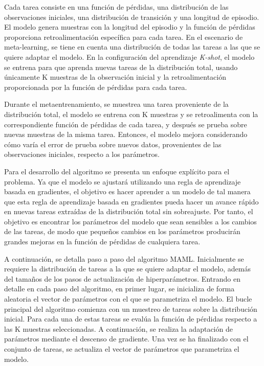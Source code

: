 Cada tarea consiste en una función de pérdidas, una distribución de las observaciones iniciales, una distribución de transición y una longitud de episodio. El modelo genera muestras con la longitud del episodio y la función de pérdidas proporciona retroalimentación específica para cada tarea.
En el escenario de meta-learning, se tiene en cuenta una distribución de todas las tareas a las que se quiere adaptar el modelo. En la configuración del aprendizaje \emph{K-shot}, el modelo se entrena para que aprenda nuevas tareas de la distribución total, usando únicamente K muestras de la observación inicial y la retroalimentación proporcionada por la función de pérdidas para cada tarea. 

Durante el metaentrenamiento, se muestrea una tarea proveniente de la distribución total, el modelo se entrena con K muestras y se retroalimenta con la correspondiente función de pérdidas de cada tarea, y después se prueba sobre nuevas muestras de la misma tarea. Entonces, el modelo mejora considerando cómo varía el error de prueba sobre nuevos datos, provenientes de las observaciones iniciales, respecto a los parámetros.

Para el desarrollo del algoritmo se presenta un enfoque explícito para el problema. Ya que el modelo se ajustará utilizando una regla de aprendizaje basada en gradientes, el objetivo es hacer aprender a un modelo de tal manera que esta regla de aprendizaje basada en gradientes pueda hacer un avance rápido en nuevas tareas extraídas de la distribución total sin sobreajuste. Por tanto, el objetivo es encontrar los parámetros del modelo que sean sensibles a los cambios de las tareas, de modo que pequeños cambios en los parámetros producirán grandes mejoras en la función de pérdidas de cualquiera tarea. 

A continuación, se detalla paso a paso del algoritmo MAML. Inicialmente se requiere la distribución de tareas a la que se quiere adaptar el modelo, además del tamaños de los pasos de actualización de hiperparámetros.
Entrando en detalle en cada paso del algoritmo, en primer lugar, se inicializa de forma aleatoria el vector de parámetros con el que se parametriza el modelo. El bucle principal del algoritmo comienza con un muestreo de tareas sobre la distribución inicial. Para cada una de estas tareas se evalúa la función de pérdidas respecto a las K muestras seleccionadas. A continuación, se realiza la adaptación de parámetros mediante el descenso de gradiente. Una vez se ha finalizado con el conjunto de tareas, se actualiza el vector de parámetros que parametriza el modelo.


